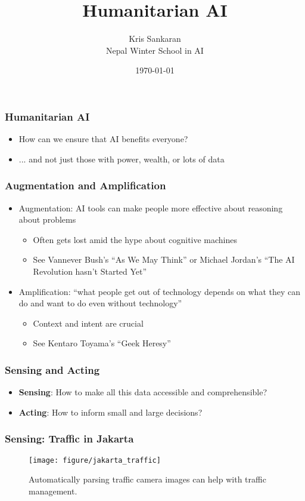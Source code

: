 \documentclass[10pt,mathserif]{beamer}
\title{\large \bfseries Humanitarian AI}
\author{Kris Sankaran\\[3ex] Nepal Winter School in AI}
\date{\today}
\begin{document}
\maketitle

\begin{frame}
  \frametitle{Humanitarian AI}
  \begin{itemize}
  \item How can we ensure that AI benefits everyone?
  \item ... and not just those with power, wealth, or lots of data
  \end{itemize}
\end{frame}

\begin{frame}
  \frametitle{Augmentation and Amplification}
  \begin{itemize}
  \item Augmentation: AI tools can make people more effective about reasoning
    about problems
    \begin{itemize}
    \item Often gets lost amid the hype about cognitive machines
    \item See Vannever Bush's ``As We May Think'' or Michael Jordan's ``The AI
      Revolution hasn't Started Yet''
    \end{itemize}
  \item Amplification: ``what people get out of technology depends on what they
    can do and want to do even without technology''
    \begin{itemize}
    \item Context and intent are crucial
    \item See Kentaro Toyama's ``Geek Heresy''
    \end{itemize}
  \end{itemize}
\end{frame}

\begin{frame}
  \frametitle{Sensing and Acting}
  \begin{itemize}
  \item \textbf{Sensing}: How to make all this data accessible and comprehensible?
  \item \textbf{Acting}: How to inform small and large decisions?
  \end{itemize}
\end{frame}

\begin{frame}
  \frametitle{Sensing: Traffic in Jakarta}
  \begin{figure}[ht]
    \centering
    \texttt{[image: figure/jakarta\_traffic]}
    \caption{Automatically parsing traffic camera images can help with traffic
      management. \label{fig:label} }
  \end{figure}
\end{frame}
\end{document}
